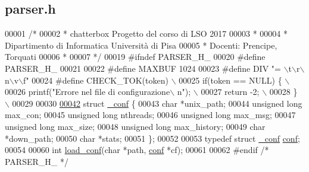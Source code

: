 \hypertarget{parser_8h_source}{}\subsection{parser.\+h}

\begin{DoxyCode}
00001 \textcolor{comment}{/*}
00002 \textcolor{comment}{ * chatterbox Progetto del corso di LSO 2017}
00003 \textcolor{comment}{ *}
00004 \textcolor{comment}{ * Dipartimento di Informatica Università di Pisa}
00005 \textcolor{comment}{ * Docenti: Prencipe, Torquati}
00006 \textcolor{comment}{ *}
00007 \textcolor{comment}{ */}
00019 \textcolor{preprocessor}{#ifndef PARSER\_H\_}
00020 \textcolor{preprocessor}{#define PARSER\_H\_}
00021 
00022 \textcolor{preprocessor}{#define MAXBUF 1024}
00023 \textcolor{preprocessor}{#define DIV "= \(\backslash\)t\(\backslash\)r\(\backslash\)n\(\backslash\)v\(\backslash\)f"}
00024 \textcolor{preprocessor}{#define CHECK\_TOK(token)    \(\backslash\)}
00025 \textcolor{preprocessor}{                                if(token == NULL) \{ \(\backslash\)}
00026 \textcolor{preprocessor}{                                                                printf("Errore nel file di configurazione\(\backslash\)
      n"); \(\backslash\)}
00027 \textcolor{preprocessor}{                                                                return -2; \(\backslash\)}
00028 \textcolor{preprocessor}{                                \} \(\backslash\)}
00029 \textcolor{preprocessor}{}
00030 
\mbox{\hyperlink{struct__conf}{00042}} \textcolor{keyword}{struct }\mbox{\hyperlink{struct__conf}{\_conf}} \{
00043                                 \textcolor{keywordtype}{char} *unix\_path;
00044                                 \textcolor{keywordtype}{unsigned} \textcolor{keywordtype}{long} max\_con;
00045                                 \textcolor{keywordtype}{unsigned} \textcolor{keywordtype}{long} nthreads;
00046                                 \textcolor{keywordtype}{unsigned} \textcolor{keywordtype}{long} max\_msg;
00047                                 \textcolor{keywordtype}{unsigned} \textcolor{keywordtype}{long} max\_size;
00048                                 \textcolor{keywordtype}{unsigned} \textcolor{keywordtype}{long} max\_history;
00049                                 \textcolor{keywordtype}{char} *down\_path;
00050                                 \textcolor{keywordtype}{char} *stats;
00051 \};
00052 
00053 \textcolor{keyword}{typedef} \textcolor{keyword}{struct }\mbox{\hyperlink{struct__conf}{\_conf}} \mbox{\hyperlink{structconf}{conf}};
00054 
00060 \textcolor{keywordtype}{int} \mbox{\hyperlink{parser_8h_ad2fe9b8d7e81085357ac987738f86908}{load\_conf}}(\textcolor{keywordtype}{char} *path, \mbox{\hyperlink{structconf}{conf}} *cf);
00061 
00062 \textcolor{preprocessor}{#endif }\textcolor{comment}{/* PARSER\_H\_ */}\textcolor{preprocessor}{}
\end{DoxyCode}
